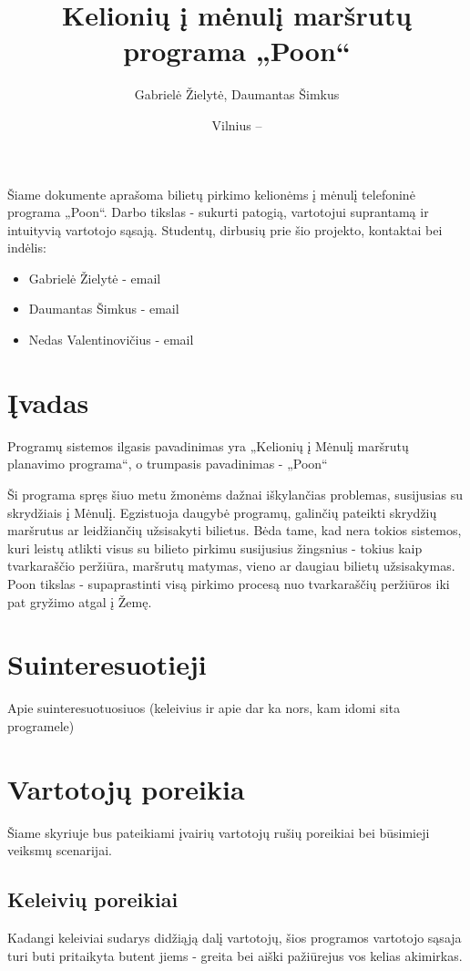 \documentclass{VUMIFPSkursinis}
\title{Kelionių į mėnulį maršrutų programa „Poon“}
\author{Gabrielė Žielytė, Daumantas Šimkus}
\date{Vilnius – \the\year}
\begin{document}
	
\maketitle
\cleardoublepage{}
\setcounter{page}{2}

\tableofcontents

Šiame dokumente aprašoma bilietų pirkimo kelionėms į mėnulį telefoninė programa „Poon“. Darbo tikslas - sukurti patogią, vartotojui suprantamą ir intuityvią vartotojo sąsają.
Studentų, dirbusių prie šio projekto, kontaktai bei indėlis:
\begin{itemize}
\item Gabrielė Žielytė - email
\item Daumantas Šimkus - email
\item Nedas Valentinovičius - email
\end{itemize}

\section{Įvadas}
Programų sistemos ilgasis pavadinimas yra „Kelionių į Mėnulį maršrutų planavimo programa“, o trumpasis pavadinimas - „Poon“

Ši programa spręs šiuo metu žmonėms dažnai iškylančias problemas, susijusias su skrydžiais į Mėnulį. Egzistuoja daugybė programų, galinčių pateikti skrydžių maršrutus ar leidžiančių užsisakyti bilietus. Bėda tame, kad nera tokios sistemos, kuri leistų atlikti visus su bilieto pirkimu susijusius žingsnius - tokius kaip tvarkaraščio peržiūra, maršrutų matymas, vieno ar daugiau bilietų užsisakymas. Poon tikslas - supaprastinti visą pirkimo procesą nuo tvarkaraščių peržiūros iki pat gryžimo atgal į Žemę. 

\section{Suinteresuotieji}
Apie suinteresuotuosiuos (keleivius ir apie dar ka nors, kam idomi sita programele)

\section{Vartotojų poreikia}
Šiame skyriuje bus pateikiami įvairių vartotojų rušių poreikiai bei būsimieji veiksmų scenarijai.
\subsection{Keleivių poreikiai}
Kadangi keleiviai sudarys didžiąją dalį vartotojų, šios programos vartotojo sąsaja turi buti pritaikyta butent jiems - greita bei aiški pažiūrejus vos kelias akimirkas.
\end{document}
